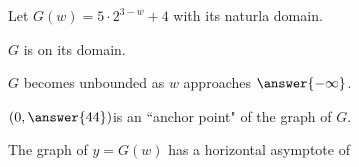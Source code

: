 \documentclass{ximera}
\author{Lee Wayand}
\begin{document}
\begin{exercise}




Let $G(w) = 5 \cdot 2^{3-w} + 4$ with its naturla domain.


\begin{question}


$G$ is  on its domain. \\


\end{question}







\begin{question}


$G$ becomes unbounded as $w$ approaches $\answer{-\infty}$.


\end{question}





\begin{question}


$\left( 0, \answer{44} \right) $is an ``anchor point" of the graph of $G$. \\


\end{question}








\begin{question}


The graph of $y=G(w)$ has a horizontal asymptote of

\begin{multipleChoice}
\end{multipleChoice}


\end{question}








\end{exercise}
\end{document}
